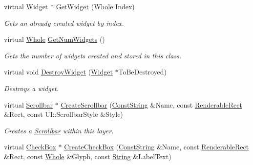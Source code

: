 \begin{DoxyCompactItemize}
virtual \hyperlink{classphys_1_1UI_1_1Widget}{Widget} $\ast$ \hyperlink{classphys_1_1UI_1_1Layer_a8506cbb9fda26895300e4ade376754ab}{GetWidget} (\hyperlink{namespacephys_a460f6bc24c8dd347b05e0366ae34f34a}{Whole} Index)
\begin{DoxyCompactList}\small\item\em Gets an already created widget by index. \item\end{DoxyCompactList}\item 
virtual \hyperlink{namespacephys_a460f6bc24c8dd347b05e0366ae34f34a}{Whole} \hyperlink{classphys_1_1UI_1_1Layer_a9501026d0546e37f2f7989a555f47500}{GetNumWidgets} ()
\begin{DoxyCompactList}\small\item\em Gets the number of widgets created and stored in this class. \item\end{DoxyCompactList}\item 
virtual void \hyperlink{classphys_1_1UI_1_1Layer_a472de1771d8e80232292ec6a19c871a6}{DestroyWidget} (\hyperlink{classphys_1_1UI_1_1Widget}{Widget} $\ast$ToBeDestroyed)
\begin{DoxyCompactList}\small\item\em Destroys a widget. \item\end{DoxyCompactList}\item 
virtual \hyperlink{classphys_1_1UI_1_1Scrollbar}{Scrollbar} $\ast$ \hyperlink{classphys_1_1UI_1_1Layer_ab7ad4b0db348beddfe63d1f9c914f1ca}{CreateScrollbar} (\hyperlink{namespacephys_a5ce5049f8b4bf88d6413c47b504ebb31}{ConstString} \&Name, const \hyperlink{structphys_1_1UI_1_1RenderableRect}{RenderableRect} \&Rect, const UI::ScrollbarStyle \&Style)
\begin{DoxyCompactList}\small\item\em Creates a \hyperlink{classphys_1_1UI_1_1Scrollbar}{Scrollbar} within this layer. \item\end{DoxyCompactList}\item 
virtual \hyperlink{classphys_1_1UI_1_1CheckBox}{CheckBox} $\ast$ \hyperlink{classphys_1_1UI_1_1Layer_aac8bb17722c2a603c40be5cfa7cfe5cc}{CreateCheckBox} (\hyperlink{namespacephys_a5ce5049f8b4bf88d6413c47b504ebb31}{ConstString} \&Name, const \hyperlink{structphys_1_1UI_1_1RenderableRect}{RenderableRect} \&Rect, const \hyperlink{namespacephys_a460f6bc24c8dd347b05e0366ae34f34a}{Whole} \&Glyph, const \hyperlink{namespacephys_aa03900411993de7fbfec4789bc1d392e}{String} \&LabelText)

\end{DoxyCompactItemize}
